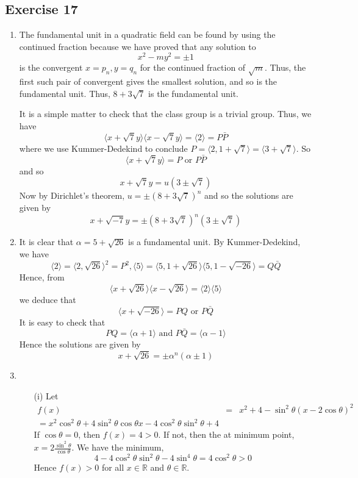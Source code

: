 \subsection{Exercise 17}
\begin{enumerate}
\item The fundamental unit in a quadratic field can be found by using the continued fraction because we have proved that any solution to
    $$x^2-my^2=\pm 1$$
    is the convergent $x=p_n,y=q_n$ for the continued fraction of $\sqrt{m}$. Thus, the first such pair of convergent gives the smallest solution, and so is the fundamental unit. Thus, $8+3\sqrt{7}$ is the fundamental unit.

    It is a simple matter to check that the class group is a trivial group. Thus, we have
    $$\langle x+\sqrt{7}y \rangle \langle x-\sqrt{7}y \rangle=\langle 2 \rangle=P\bar{P}$$
    where we use Kummer-Dedekind to conclude $P=\langle 2,1+\sqrt{7} \rangle=\langle 3+\sqrt{7} \rangle$.
    So
    $$\langle x+\sqrt{7}y \rangle=P \text{ or }P\bar{P}$$
    and so
    $$x+\sqrt{7}y=u(3\pm \sqrt{7})$$
    Now by Dirichlet's theorem, $u=\pm (8+3\sqrt{7})^n$ and so the solutions are given by
    $$x+\sqrt{-7}y=\pm (8+3\sqrt{7})^n (3 \pm \sqrt{7})$$
\item It is clear that $\alpha=5+\sqrt{26}$ is a fundamental unit. By Kummer-Dedekind, we have
$$\langle 2 \rangle=\langle 2,\sqrt{26}\rangle^2=P^2, \langle 5 \rangle=\langle 5,1+\sqrt{26}\rangle \langle 5,1-\sqrt{-26}\rangle=Q\bar{Q}$$
Hence, from
$$\langle x+\sqrt{26} \rangle \langle x-\sqrt{26} \rangle=\langle 2 \rangle \langle 5 \rangle$$
we deduce that
$$\langle x+\sqrt{-26} \rangle=PQ \text{ or }P\bar{Q}$$
It is easy to check that
$$PQ=\langle \alpha+1 \rangle \text{ and } P\bar{Q}=\langle \alpha-1 \rangle$$
Hence the solutions are given by
$$x+\sqrt{26}=\pm \alpha^n(\alpha \pm 1)$$
\item \begin{enumerate}
\item[(i)] Let
\begin{eqnarray*}
f(x)&=&x^2+4-\sin^2{\theta}(x-2\cos{\theta})^2\\
=x^2\cos^2{\theta}+4\sin^2{\theta}\cos{\theta}x-4\cos^2{\theta}\sin^2{\theta}+4
\end{eqnarray*}
If $\cos{\theta}=0$, then $f(x)=4>0$. If not, then the at minimum point, $x=2\frac{\sin^2{\theta}}{\cos{\theta}}$. We have the minimum,
$$4-4\cos^2{\theta}\sin^2{\theta}-4\sin^4{\theta}=4\cos^2{\theta}>0$$
Hence $f(x)>0$ for all $x \in \mathbb{R}$ and $\theta \in \mathbb{R}$.\\

\end{enumerate}
\end{enumerate}
